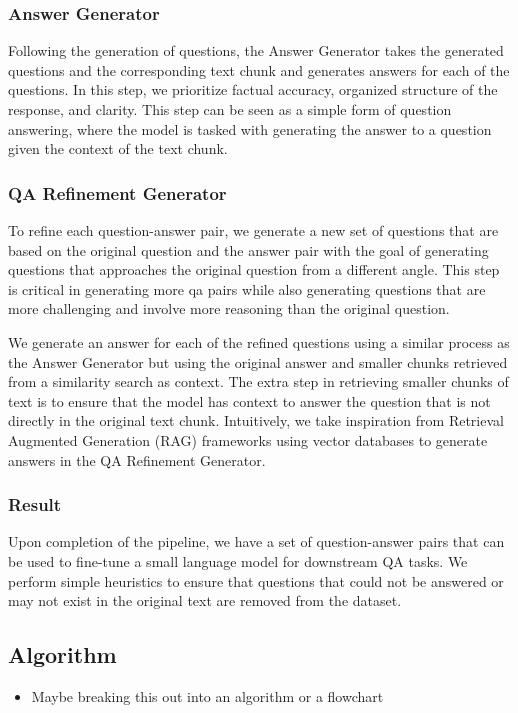 \subsubsection{Answer Generator}

Following the generation of questions, the Answer Generator takes the generated questions and the corresponding text chunk and generates answers for each of the questions. 
In this step, we prioritize factual accuracy, organized structure of the response, and clarity. This step can be seen as a simple form of question answering, where the model is
tasked with generating the answer to a question given the context of the text chunk.

\subsubsection{QA Refinement Generator}

To refine each question-answer pair, we generate a new set of questions that are based on the original question and the answer pair 
with the goal of generating questions that approaches the original question from a different angle. This step is critical in 
generating more qa pairs while also generating questions that are more challenging and involve more reasoning than the original question. 

We generate an answer for each of the refined questions using a similar process as the Answer Generator but using the original answer
and smaller chunks retrieved from a similarity search as context. The extra step in retrieving smaller chunks of text is to ensure that the model
has context to answer the question that is not directly in the original text chunk. Intuitively, we take inspiration from Retrieval Augmented Generation 
(RAG) frameworks using vector databases to generate answers in the QA Refinement Generator.

\subsubsection{Result}

Upon completion of the pipeline, we have a set of question-answer pairs that can be used to fine-tune a small language model for downstream QA tasks. 
We perform simple heuristics to ensure that questions that could not be answered or may not exist in the original text are removed from the dataset.

\subsection{Algorithm}
\begin{itemize}
  \item Maybe breaking this out into an algorithm or a flowchart
\end{itemize}

